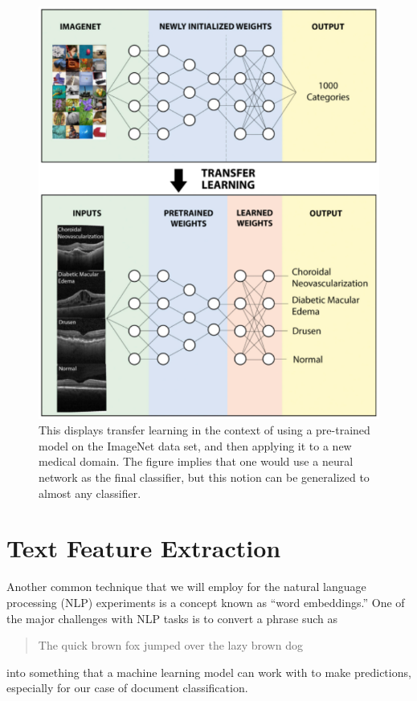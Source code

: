 \documentclass[../thesis.tex]{subfiles}
\begin{document}
\begin{figure}
    \centering
    \includegraphics[width=\linewidth]{images/transfer_learning.pdf}
    \caption[Transfer Learning Example]{This displays transfer learning in the context of using a pre-trained model on the ImageNet data set, and then applying it to a new medical domain. The figure implies that one would use a neural network as the final classifier, but this notion can be generalized to almost any classifier.}
    \label{fig:transfer_learning}
\end{figure}

\section{Text Feature Extraction}
Another common technique that we will employ for the natural language processing (NLP) experiments is a concept known as ``word embeddings.'' One of the major challenges with NLP tasks is to convert a phrase such as
\begin{quote}
    The quick brown fox jumped over the lazy brown dog
\end{quote}
into something that a machine learning model can work with to make predictions, especially for our case of document classification.
\end{document}
